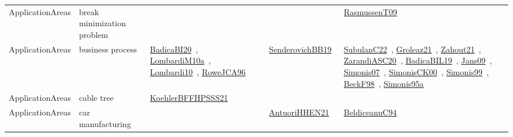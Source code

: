 {\begin{longtable}{lp{3cm}>{\raggedright\arraybackslash}p{6cm}>{\raggedright\arraybackslash}p{6cm}>{\raggedright\arraybackslash}p{8cm}}
\index{break minimization problem}\index{ApplicationAreas!break minimization problem}ApplicationAreas & break minimization problem &  &  & \href{../works/RasmussenT09.pdf}{RasmussenT09}~\cite{RasmussenT09}\\
\index{business process}\index{ApplicationAreas!business process}ApplicationAreas & business process & \href{../works/BadicaBI20.pdf}{BadicaBI20}~\cite{BadicaBI20}, \href{../works/LombardiM10a.pdf}{LombardiM10a}~\cite{LombardiM10a}, \href{../works/Lombardi10.pdf}{Lombardi10}~\cite{Lombardi10}, \href{../works/RoweJCA96.pdf}{RoweJCA96}~\cite{RoweJCA96} & \href{../works/SenderovichBB19.pdf}{SenderovichBB19}~\cite{SenderovichBB19} & \href{../works/SubulanC22.pdf}{SubulanC22}~\cite{SubulanC22}, \href{../works/Groleaz21.pdf}{Groleaz21}~\cite{Groleaz21}, \href{../works/Zahout21.pdf}{Zahout21}~\cite{Zahout21}, \href{../works/ZarandiASC20.pdf}{ZarandiASC20}~\cite{ZarandiASC20}, \href{../works/BadicaBIL19.pdf}{BadicaBIL19}~\cite{BadicaBIL19}, \href{../works/Jans09.pdf}{Jans09}~\cite{Jans09}, \href{../works/Simonis07.pdf}{Simonis07}~\cite{Simonis07}, \href{../works/SimonisCK00.pdf}{SimonisCK00}~\cite{SimonisCK00}, \href{../works/Simonis99.pdf}{Simonis99}~\cite{Simonis99}, \href{../works/BeckF98.pdf}{BeckF98}~\cite{BeckF98}, \href{../works/Simonis95a.pdf}{Simonis95a}~\cite{Simonis95a}\\
\index{cable tree}\index{ApplicationAreas!cable tree}ApplicationAreas & cable tree & \href{../works/KoehlerBFFHPSSS21.pdf}{KoehlerBFFHPSSS21}~\cite{KoehlerBFFHPSSS21} &  & \\
\index{car manufacturing}\index{ApplicationAreas!car manufacturing}ApplicationAreas & car manufacturing &  & \href{../works/AntuoriHHEN21.pdf}{AntuoriHHEN21}~\cite{AntuoriHHEN21} & \href{../works/BeldiceanuC94.pdf}{BeldiceanuC94}~\cite{BeldiceanuC94}\\

\end{longtable}}
